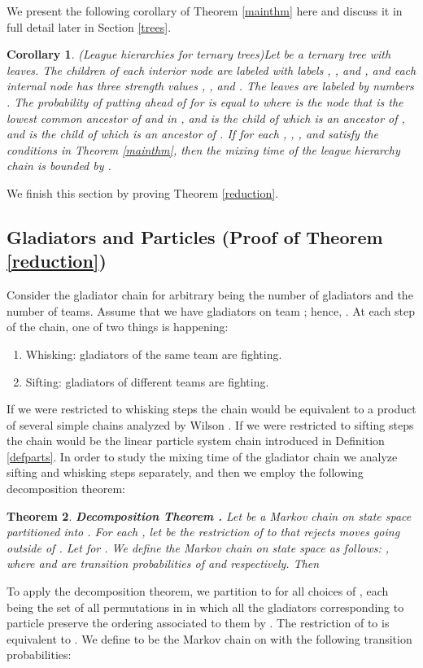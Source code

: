 \documentclass[10 pt]{article}
\newtheorem{thm}{Theorem}[section]
\newtheorem{con}[thm]{Corollary}
\begin{document}
We present the following corollary of Theorem \ref{mainthm} here and discuss it in full detail later in Section \ref{trees}.
 
\begin{con}(League hierarchies for ternary trees)\label{LeagueHi}
Let  be a ternary tree  with  leaves. The children of each interior node  are labeled with labels , , and ,
and each internal node has three strength values , , and . The leaves are labeled by numbers .
The probability of putting  ahead of  for  is equal to  where  is the node
that is the lowest common ancestor of  and  in , and  is the child of  which is an ancestor of ,
and  is the child of  which is an ancestor of . If for each , , , and 
satisfy the conditions in Theorem \ref{mainthm}, then the mixing time of the league hierarchy chain is bounded by .
\end{con} 

 
 \medskip
  
We finish this section by proving Theorem \ref{reduction}.
 
\subsection{Gladiators and Particles (Proof of Theorem \ref{reduction})}

Consider the gladiator chain  for arbitrary  being the number of gladiators  and  the number of teams.
Assume that we have  gladiators on team ; hence, .  At each step of the chain, one of two things is happening: 
\begin{enumerate}
\item Whisking: gladiators of the same team are fighting. 
\item Sifting:  gladiators of different teams are fighting.
\end{enumerate}
If we were restricted to  whisking steps the chain would be equivalent to a product of several simple chains analyzed by Wilson \cite{Wilson}.
If we were restricted to sifting steps the chain would be the linear particle system chain introduced in Definition \ref{defparts}. 
In order to study the mixing time of the gladiator chain we  analyze sifting and whisking steps separately, and then we employ the
following decomposition theorem: 

\begin{thm}\label{decom}  \textbf{Decomposition Theorem \cite{Decomposition}.}
Let  be a Markov chain on state space  partitioned into .
For each , let  be the restriction of  to  that rejects  moves  going outside of .
Let  for . We define the Markov chain  on
state space  as follows: ,
where  and  are transition probabilities of  and  respectively. 
Then 

\end{thm}
 To apply the decomposition theorem, we partition  to  for all choices of , each  being the set of all permutations in
 in which all the gladiators corresponding to particle  preserve the ordering associated to them by .
The restriction of  to  is equivalent to .
We define  to be the Markov chain on  with the following transition probabilities: 
\end{document}
